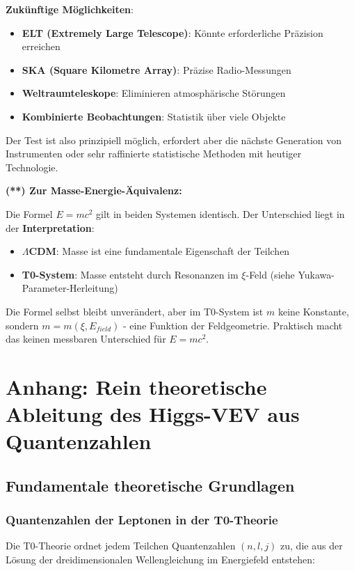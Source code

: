 \documentclass[12pt,a4paper]{article}
\begin{document}
\textbf{Zukünftige Möglichkeiten}:
\begin{itemize}
	\item \textbf{ELT (Extremely Large Telescope)}: Könnte erforderliche Präzision erreichen
	\item \textbf{SKA (Square Kilometre Array)}: Präzise Radio-Messungen
	\item \textbf{Weltraumteleskope}: Eliminieren atmosphärische Störungen
	\item \textbf{Kombinierte Beobachtungen}: Statistik über viele Objekte
\end{itemize}

Der Test ist also prinzipiell möglich, erfordert aber die nächste Generation von Instrumenten oder sehr raffinierte statistische Methoden mit heutiger Technologie.

\textbf{(**) Zur Masse-Energie-Äquivalenz:}

Die Formel $E = mc^2$ gilt in beiden Systemen identisch. Der Unterschied liegt in der \textbf{Interpretation}:

\begin{itemize}
	\item \textbf{$\Lambda$CDM}: Masse ist eine fundamentale Eigenschaft der Teilchen
	\item \textbf{T0-System}: Masse entsteht durch Resonanzen im $\xi$-Feld (siehe Yukawa-Parameter-Herleitung)
\end{itemize}

Die Formel selbst bleibt unverändert, aber im T0-System ist $m$ keine Konstante, sondern $m = m(\xi, E_{field})$ - eine Funktion der Feldgeometrie. Praktisch macht das keinen messbaren Unterschied für $E = mc^2$.
\appendix

\section{Anhang: Rein theoretische Ableitung des Higgs-VEV aus Quantenzahlen}

\subsection{Fundamentale theoretische Grundlagen}

\subsubsection{Quantenzahlen der Leptonen in der T0-Theorie}

Die T0-Theorie ordnet jedem Teilchen Quantenzahlen $(n, l, j)$ zu, die aus der Lösung der dreidimensionalen Wellengleichung im Energiefeld entstehen:
\end{document}
